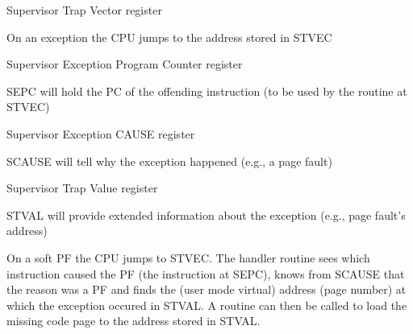 \newpar{}
 Supervisor Trap Vector register

On an exception the CPU jumps to the address stored in STVEC

\newpar{}
 Supervisor Exception Program Counter register

SEPC will hold the PC of the offending instruction (to be used by the routine at STVEC)

\newpar{}
 Supervisor Exception CAUSE register

SCAUSE will tell why the exception happened (e.g., a page fault)

\newpar{}
 Supervisor Trap Value register

STVAL will provide extended information about the exception (e.g., page fault's address)

\newpar{}

On a soft PF the CPU jumps to STVEC. The handler routine sees which instruction caused the PF (the instruction at SEPC), knows from SCAUSE that the reason was a PF and finds the (user mode virtual) address (page number) at which the exception occured in STVAL. A routine can then be called to load the missing code page to the address stored in STVAL.
